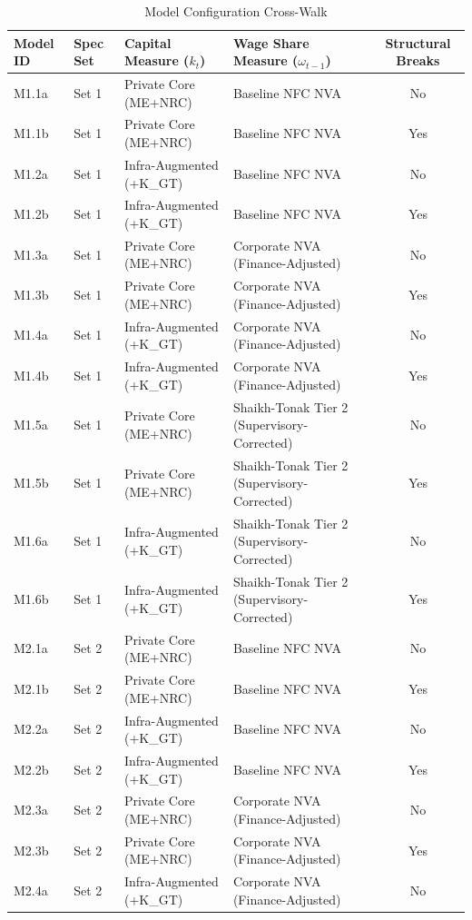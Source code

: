 \begin{table}[H]
\centering
\caption{Model Configuration Cross-Walk}
\label{tab:model_crosswalk}
\scriptsize
\begin{tabular}{ll p{4cm} p{5.5cm} c}
\toprule
Model ID & Spec Set & Capital Measure ($k_t$) & Wage Share Measure ($\omega_{t-1}$) & Structural Breaks \\
\midrule
M1.1a & Set 1 & Private Core (ME+NRC) & Baseline NFC NVA & No \\
M1.1b & Set 1 & Private Core (ME+NRC) & Baseline NFC NVA & Yes \\
M1.2a & Set 1 & Infra-Augmented (+K\_GT) & Baseline NFC NVA & No \\
M1.2b & Set 1 & Infra-Augmented (+K\_GT) & Baseline NFC NVA & Yes \\
M1.3a & Set 1 & Private Core (ME+NRC) & Corporate NVA (Finance-Adjusted) & No \\
M1.3b & Set 1 & Private Core (ME+NRC) & Corporate NVA (Finance-Adjusted) & Yes \\
M1.4a & Set 1 & Infra-Augmented (+K\_GT) & Corporate NVA (Finance-Adjusted) & No \\
M1.4b & Set 1 & Infra-Augmented (+K\_GT) & Corporate NVA (Finance-Adjusted) & Yes \\
M1.5a & Set 1 & Private Core (ME+NRC) & Shaikh-Tonak Tier 2 (Supervisory-Corrected) & No \\
M1.5b & Set 1 & Private Core (ME+NRC) & Shaikh-Tonak Tier 2 (Supervisory-Corrected) & Yes \\
M1.6a & Set 1 & Infra-Augmented (+K\_GT) & Shaikh-Tonak Tier 2 (Supervisory-Corrected) & No \\
M1.6b & Set 1 & Infra-Augmented (+K\_GT) & Shaikh-Tonak Tier 2 (Supervisory-Corrected) & Yes \\
M2.1a & Set 2 & Private Core (ME+NRC) & Baseline NFC NVA & No \\
M2.1b & Set 2 & Private Core (ME+NRC) & Baseline NFC NVA & Yes \\
M2.2a & Set 2 & Infra-Augmented (+K\_GT) & Baseline NFC NVA & No \\
M2.2b & Set 2 & Infra-Augmented (+K\_GT) & Baseline NFC NVA & Yes \\
M2.3a & Set 2 & Private Core (ME+NRC) & Corporate NVA (Finance-Adjusted) & No \\
M2.3b & Set 2 & Private Core (ME+NRC) & Corporate NVA (Finance-Adjusted) & Yes \\
M2.4a & Set 2 & Infra-Augmented (+K\_GT) & Corporate NVA (Finance-Adjusted) & No \\

\end{tabular}
\end{table}
